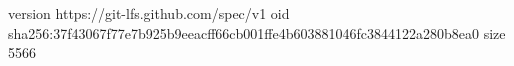version https://git-lfs.github.com/spec/v1
oid sha256:37f43067f77e7b925b9eeacff66cb001ffe4b603881046fc3844122a280b8ea0
size 5566
